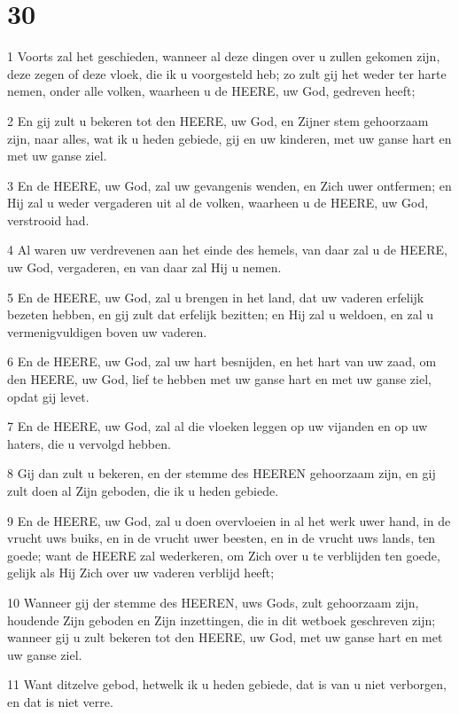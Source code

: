 \chapter{30}

\par 1 Voorts zal het geschieden, wanneer al deze dingen over u zullen gekomen zijn, deze zegen of deze vloek, die ik u voorgesteld heb; zo zult gij het weder ter harte nemen, onder alle volken, waarheen u de HEERE, uw God, gedreven heeft;
\par 2 En gij zult u bekeren tot den HEERE, uw God, en Zijner stem gehoorzaam zijn, naar alles, wat ik u heden gebiede, gij en uw kinderen, met uw ganse hart en met uw ganse ziel.
\par 3 En de HEERE, uw God, zal uw gevangenis wenden, en Zich uwer ontfermen; en Hij zal u weder vergaderen uit al de volken, waarheen u de HEERE, uw God, verstrooid had.
\par 4 Al waren uw verdrevenen aan het einde des hemels, van daar zal u de HEERE, uw God, vergaderen, en van daar zal Hij u nemen.
\par 5 En de HEERE, uw God, zal u brengen in het land, dat uw vaderen erfelijk bezeten hebben, en gij zult dat erfelijk bezitten; en Hij zal u weldoen, en zal u vermenigvuldigen boven uw vaderen.
\par 6 En de HEERE, uw God, zal uw hart besnijden, en het hart van uw zaad, om den HEERE, uw God, lief te hebben met uw ganse hart en met uw ganse ziel, opdat gij levet.
\par 7 En de HEERE, uw God, zal al die vloeken leggen op uw vijanden en op uw haters, die u vervolgd hebben.
\par 8 Gij dan zult u bekeren, en der stemme des HEEREN gehoorzaam zijn, en gij zult doen al Zijn geboden, die ik u heden gebiede.
\par 9 En de HEERE, uw God, zal u doen overvloeien in al het werk uwer hand, in de vrucht uws buiks, en in de vrucht uwer beesten, en in de vrucht uws lands, ten goede; want de HEERE zal wederkeren, om Zich over u te verblijden ten goede, gelijk als Hij Zich over uw vaderen verblijd heeft;
\par 10 Wanneer gij der stemme des HEEREN, uws Gods, zult gehoorzaam zijn, houdende Zijn geboden en Zijn inzettingen, die in dit wetboek geschreven zijn; wanneer gij u zult bekeren tot den HEERE, uw God, met uw ganse hart en met uw ganse ziel.
\par 11 Want ditzelve gebod, hetwelk ik u heden gebiede, dat is van u niet verborgen, en dat is niet verre.
